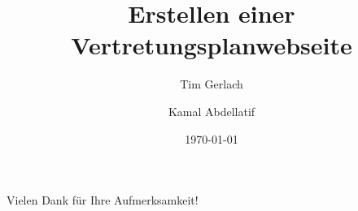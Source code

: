 \documentclass{beamer}
\title{Erstellen einer Vertretungsplanwebseite}
\author{Tim Gerlach \and Kamal Abdellatif}
\institute{Carl-Zeiss-Gymnasium Jena}
\date{\today}
\begin{document}
\begin{frame}[plain]
	\titlepage
\end{frame}



\begin{frame}\center\Huge Vielen Dank für Ihre Aufmerksamkeit!\end{frame}
\end{document}
